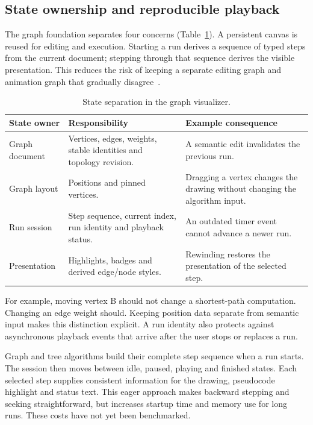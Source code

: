 \documentclass[11pt,a4paper]{article}
\newcommand{\page}{\par\vspace{8pt}}
\begin{document}
\page
\subsection{State ownership and reproducible playback}\label{sec:state}
The graph foundation separates four concerns (Table~\ref{tab:state}). A persistent canvas is reused for editing and execution. Starting a run derives a sequence of typed steps from the current document; stepping through that sequence derives the visible presentation. This reduces the risk of keeping a separate editing graph and animation graph that gradually disagree~\cite{architecture}.

\begin{table}[tbp]\small\centering
\caption{State separation in the graph visualizer.}\label{tab:state}
\begin{tabularx}{\linewidth}{@{}p{31mm}X X@{}}\toprule
State owner & Responsibility & Example consequence\\\midrule
Graph document & Vertices, edges, weights, stable identities and topology revision. & A semantic edit invalidates the previous run.\\
Graph layout & Positions and pinned vertices. & Dragging a vertex changes the drawing without changing the algorithm input.\\
Run session & Step sequence, current index, run identity and playback status. & An outdated timer event cannot advance a newer run.\\
Presentation & Highlights, badges and derived edge/node styles. & Rewinding restores the presentation of the selected step.\\\bottomrule
\end{tabularx}
\end{table}

For example, moving vertex B should not change a shortest-path computation. Changing an edge weight should. Keeping position data separate from semantic input makes this distinction explicit. A run identity also protects against asynchronous playback events that arrive after the user stops or replaces a run.

Graph and tree algorithms build their complete step sequence when a run starts. The session then moves between idle, paused, playing and finished states. Each selected step supplies consistent information for the drawing, pseudocode highlight and status text. This eager approach makes backward stepping and seeking straightforward, but increases startup time and memory use for long runs. These costs have not yet been benchmarked.
\end{document}
